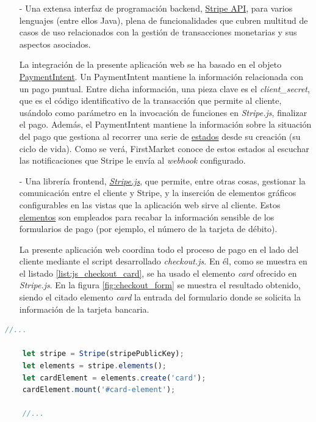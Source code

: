 \documentclass[a4paper]{article}
\begin{document}
    \begin{itemize}
    	\item[-] Una extensa interfaz de programación backend, \href{https://stripe.com/docs/api}{Stripe API}, para varios lenguajes (entre ellos Java), plena de funcionalidades que cubren multitud de casos de uso relacionados con la gestión de transacciones monetarias y sus aspectos asociados.
    	
    	La integración de la presente aplicación web se ha basado en el objeto \href{https://stripe.com/docs/api/payment_intents}{PaymentIntent}. Un PaymentIntent mantiene la información relacionada con un pago puntual. Entre dicha información, una pieza clave es el \emph{client\_secret}, que es el código identificativo de la transacción que permite al cliente, usándolo como parámetro en la invocación de funciones en \emph{Stripe.js}, finalizar el pago. Además, el PaymentIntent mantiene la información sobre la situación del pago que gestiona al recorrer una serie de \href{https://stripe.com/docs/payments/intents#intent-statuses}{estados} desde su creación (su ciclo de vida). Como se verá, FirstMarket conoce de estos estados al escuchar las notificaciones que Stripe le envía al \emph{webhook} configurado.
    	
    	\item[-] Una librería frontend, \href{https://stripe.com/docs/js}{\emph{Stripe.js}}, que permite, entre otras cosas, gestionar la comunicación entre el cliente y Stripe, y la inserción de elementos gráficos configurables en las vistas que la aplicación web sirve al cliente. Estos \href{https://stripe.com/docs/js/elements_object}{elementos} son empleados para recabar la información sensible de los formularios de pago (por ejemplo, el número de la tarjeta de débito).
    	
    	La presente aplicación web coordina todo el proceso de pago en el lado del cliente mediante el script desarrollado \emph{checkout.js}. En él, como se muestra en el listado \ref{list:js_checkout_card}, se ha usado el elemento \emph{card} ofrecido en \emph{Stripe.js}. En la figura \ref{fig:checkout_form} se muestra el resultado obtenido, siendo el citado elemento \emph{card} la entrada del formulario donde se solicita la información de la tarjeta bancaria.
    \end{itemize}
    
    \begin{lstlisting}[language=Javascript,caption=Extracto de checkout.js donde se crea y enlaza el elemento \emph{card},label=list:js_checkout_card]
    //...
    
    let stripe = Stripe(stripePublicKey);
    let elements = stripe.elements();
    let cardElement = elements.create('card');
    cardElement.mount('#card-element');
    
    //...
    \end{lstlisting}
    
\end{document}
